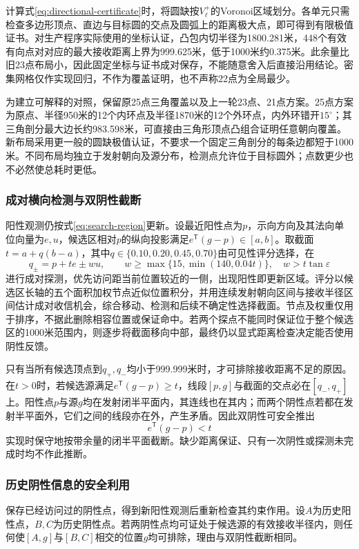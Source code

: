 计算式\eqref{eq:directional-certificate}时，将圆缺按$V_\ell^+$的Voronoi区域划分。各单元只需检查多边形顶点、直边与目标圆的交点及圆弧上的距离极大点，即可得到有限极值证书。对生产程序实际使用的坐标认证，凸包内切半径为1800.281米，448个有效有向点对对应的最大接收距离上界为999.625米，低于1000米约0.375米。此余量比旧23点布局小，因此固定坐标与证书成对保存，不能随意舍入后直接沿用结论。密集网格仅作实现回归，不作为覆盖证明，也不声称22点为全局最少。

为建立可解释的对照，保留原25点三角覆盖以及上一轮23点、21点方案。25点方案为原点、半径950米的12个内环点及半径1870米的12个外环点，内外环错开$15^\circ$；其三角剖分最大边长约983.598米，可直接由三角形顶点凸组合证明任意朝向覆盖。新布局采用更一般的圆缺极值认证，不要求一个固定三角剖分的每条边都短于1000米。不同布局均独立于发射朝向及源分布，检测点允许位于目标圆外；点数更少也不必然使总耗时更低。

\subsubsection{成对横向检测与双阴性截断}
阳性观测仍按式\eqref{eq:search-region}更新。设最近阳性点为$p$，示向方向及其法向单位向量为$e,u$，候选区相对$p$的纵向投影满足$e^{\mathsf T}(g-p)\in[a,b]$。取截面$t=a+q(b-a)$，其中$q\in\{0.10,0.20,0.45,0.70\}$由可见性评分选择，在
\begin{equation}
 q_\pm=p+te\pm wu,\qquad
 w\ge\max\{15,\min(140,0.04t)\},\quad w>t\tan\varepsilon
 \label{eq:paired-probe}
\end{equation}
进行成对探测，优先访问距当前位置较近的一侧，出现阳性即更新区域。评分以候选区长轴的五个面积加权节点近似位置积分，并用连续发射朝向区间与接收半径区间估计成对收信机会，综合移动、检测和后续不确定性选择截面。节点及权重仅用于排序，不据此删除相容位置或保证命中。若两个探点不能同时保证位于整个候选区的1000米范围内，则逐步将截面移向中部，最终仍以显式距离检查决定能否使用阴性反馈。

只有当所有候选顶点到$q_+,q_-$均小于999.999米时，才可排除接收距离不足的原因。在$t>0$时，若候选源满足$e^{\mathsf T}(g-p)\ge t$，线段$[p,g]$与截面的交点必在$[q_-,q_+]$上。阳性点$p$与源$g$均在发射闭半平面内，其连线也在其内；而两个阴性点若都在发射半平面外，它们之间的线段亦在外，产生矛盾。因此双阴性可安全推出
\begin{equation}
 e^{\mathsf T}(g-p)<t
 \label{eq:paired-negative}
\end{equation}
实现时保守地按带余量的闭半平面截断。缺少距离保证、只有一次阴性或探测未完成时均不作此推断。

\subsubsection{历史阴性信息的安全利用}
保存已经访问过的阴性点，得到新阳性观测后重新检查其约束作用。设$A$为历史阳性点，$B,C$为历史阴性点。若两阴性点均可证处于候选源的有效接收半径内，则任何使$[A,g]$与$[B,C]$相交的位置$g$均可排除，理由与双阴性截断相同。

